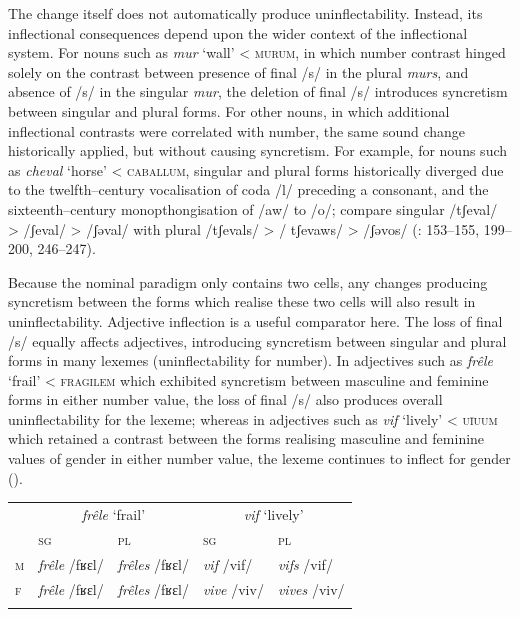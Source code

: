 \documentclass[output=paper]{langscibook}
\begin{document}
The change itself does not automatically produce uninflectability. Instead, its inflectional consequences depend upon the wider context of the inflectional system. For nouns such as \textit{mur} ‘wall’ < \textsc{murum}, in which number contrast hinged solely on the contrast between presence of final /s/ in the plural \textit{murs}, and absence of /s/ in the singular \textit{mur}, the deletion of final /s/ introduces syncretism between singular and plural forms. For other nouns, in which additional inflectional contrasts were correlated with number, the same sound change historically applied, but without causing syncretism. For example, for nouns such as \textit{cheval} ‘horse’ < \textsc{caballum}, singular and plural forms historically diverged due to the twelfth–century vocalisation of coda /l/ preceding a consonant, and the sixteenth–century monopthongisation of /aw/ to /o/; compare singular /tʃeval/ > /ʃeval/ > /ʃəval/ with plural /tʃevals/ > / tʃevaws/ > /ʃəvos/ (\citealt{Pope1934}: 153–155, 199–200, 246–247).

Because the nominal paradigm only contains two cells, any changes producing syncretism between the forms which realise these two cells will also result in uninflectability. Adjective inflection is a useful comparator here. The loss of final /s/ equally affects adjectives, introducing syncretism between singular and plural forms in many lexemes (uninflectability for number). In adjectives such as \textit{frêle} ‘frail’ < \textsc{fragilem} which exhibited syncretism between masculine and feminine forms in either number value, the loss of final /s/ also produces overall uninflectability for the lexeme; whereas in adjectives such as \textit{vif} ‘lively’ < \textsc{uīuum} which retained a contrast between the forms realising masculine and feminine values of gender in either number value, the lexeme continues to inflect for gender ().


\begin{tabularx}{\textwidth}{XXXXX}
 & \multicolumn{2}{c}{\textit{frêle} ‘frail’} & \multicolumn{2}{c}{\textit{vif} ‘lively’}\\
\lsptoprule
& \textsc{sg} & \textsc{pl} & \textsc{sg} & \textsc{pl}\\
\textsc{m} & \textit{frêle} /fʁɛl/ & \textit{frêles} /fʁɛl/ & \textit{vif} /vif/ & \textit{vifs} /vif/\\
\textsc{f} & \textit{frêle} /fʁɛl/ & \textit{frêles} /fʁɛl/ & \textit{vive} /viv/ & \textit{vives} /viv/\\
\lspbottomrule
\end{tabularx}
\begin{stylelsTableHeading}%
\begin{table}
\caption{Inflection of \textit{frêle} ‘frail’ and \textit{vif} ‘lively’ in modern French.}
\label{tab:key:3}
\end{table}\end{stylelsTableHeading}
\end{document}
